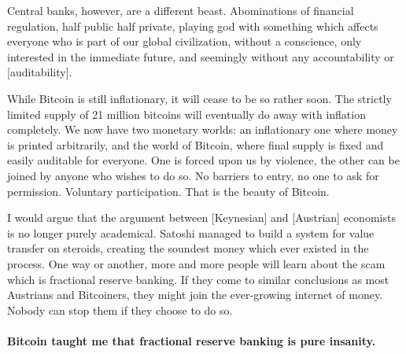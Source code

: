 Central banks, however, are a different beast. Abominations of financial
regulation, half public half private, playing god with something which
affects everyone who is part of our global civilization, without a
conscience, only interested in the immediate future, and seemingly
without any accountability or [auditability].

While Bitcoin is still inflationary, it will cease to be so rather soon.
The strictly limited supply of 21 million bitcoins will eventually do
away with inflation completely. We now have two monetary worlds: an
inflationary one where money is printed arbitrarily, and the world of
Bitcoin, where final supply is fixed and easily auditable for everyone.
One is forced upon us by violence, the other can be joined by anyone who
wishes to do so. No barriers to entry, no one to ask for permission.
Voluntary participation. That is the beauty of Bitcoin.

I would argue that the argument between [Keynesian] and [Austrian]
economists is no longer purely academical. Satoshi managed to build a
system for value transfer on steroids, creating the soundest money which
ever existed in the process. One way or another, more and more people
will learn about the scam which is fractional reserve banking. If they
come to similar conclusions as most Austrians and Bitcoiners, they might
join the ever-growing internet of money. Nobody can stop them if they
choose to do so.

\paragraph{Bitcoin taught me that fractional reserve banking is pure insanity.}

%
%
%
%
%

